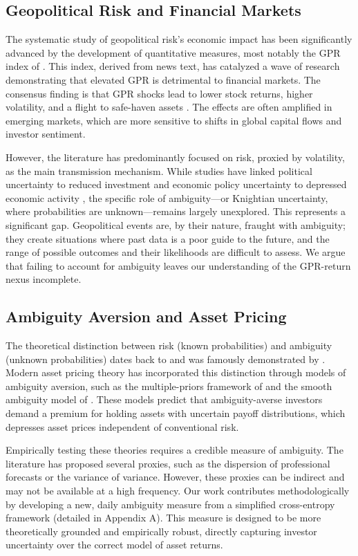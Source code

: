 \documentclass[preprint,12pt,authoryear]{elsarticle}
\begin{document}
\subsection{Geopolitical Risk and Financial Markets}

The systematic study of geopolitical risk's economic impact has been significantly advanced by the development of quantitative measures, most notably the GPR index of \citet{Caldara2022}. This index, derived from news text, has catalyzed a wave of research demonstrating that elevated GPR is detrimental to financial markets. The consensus finding is that GPR shocks lead to lower stock returns, higher volatility, and a flight to safe-haven assets \citep{Caldara2022}. The effects are often amplified in emerging markets, which are more sensitive to shifts in global capital flows and investor sentiment.

However, the literature has predominantly focused on risk, proxied by volatility, as the main transmission mechanism. While studies have linked political uncertainty to reduced investment \citep{Pastor2013} and economic policy uncertainty to depressed economic activity \citep{Baker2016}, the specific role of ambiguity—or Knightian uncertainty, where probabilities are unknown—remains largely unexplored. This represents a significant gap. Geopolitical events are, by their nature, fraught with ambiguity; they create situations where past data is a poor guide to the future, and the range of possible outcomes and their likelihoods are difficult to assess. We argue that failing to account for ambiguity leaves our understanding of the GPR-return nexus incomplete.

\subsection{Ambiguity Aversion and Asset Pricing}

The theoretical distinction between risk (known probabilities) and ambiguity (unknown probabilities) dates back to \citet{Knight1921} and was famously demonstrated by \citet{Ellsberg1961}. Modern asset pricing theory has incorporated this distinction through models of ambiguity aversion, such as the multiple-priors framework of \citet{Gilboa1989} and the smooth ambiguity model of \citet{Klibanoff2005}. These models predict that ambiguity-averse investors demand a premium for holding assets with uncertain payoff distributions, which depresses asset prices independent of conventional risk.

Empirically testing these theories requires a credible measure of ambiguity. The literature has proposed several proxies, such as the dispersion of professional forecasts \citep{Brenner2018, Ulrich2013} or the variance of variance. However, these proxies can be indirect and may not be available at a high frequency. Our work contributes methodologically by developing a new, daily ambiguity measure from a simplified cross-entropy framework (detailed in Appendix A). This measure is designed to be more theoretically grounded and empirically robust, directly capturing investor uncertainty over the correct model of asset returns.
\end{document}
